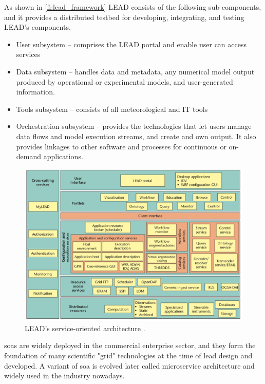 As shown in \cref{fi:lead_framework} LEAD consists of the following sub-components, and it provides a distributed testbed for developing, integrating, and testing LEAD's components.
\begin{itemize}
    \item User subsystem -- comprises the LEAD portal and enable user can access services
    \item Data subsystem -- handles data and metadata, any numerical model output produced by operational or experimental models, and user-generated information.
    \item Tools subsystem -- consists of all meteorological and IT tools
    \item Orchestration subsystem -- provides the technologies that let users manage data flows and model execution streams, and create and own output. It also provides linkages to other software and processes for continuous or on-demand applications.
\end{itemize}

\begin{figure}[htp]
    \centering
    \includegraphics[width=1\textwidth]{lit/lead/LEADs-service-oriented-architecture-A-wide-variety-of-services-and-resources-grouped_W640.png}
    \caption[LEAD's service-oriented architecture]{LEAD's service-oriented architecture \cite{Droegemeier2005Service-OrientedWeather}.}
    \label{fi:lead_soa}
\end{figure}

\acrshort{soa}s are widely deployed in the commercial enterprise sector, and they form the foundation of many scientific "grid" technologies at the time of \acrshort{lead} design and developed. A variant of \acrshort{soa} is evolved later called microservice architecture and widely used in the industry nowadays.

